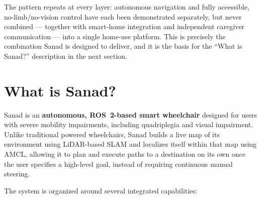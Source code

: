 The pattern repeats at every layer: autonomous navigation and fully accessible, no-limb/no-vision control have each been demonstrated separately, but never combined --- together with smart-home integration and independent caregiver communication --- into a single home-use platform. This is precisely the combination Sanad is designed to deliver, and it is the basis for the ``What is Sanad?'' description in the next section.

\section{What is Sanad?}

Sanad is an \textbf{autonomous, ROS~2-based smart wheelchair} designed for users with severe mobility impairments, including quadriplegia and visual impairment. Unlike traditional powered wheelchairs, Sanad builds a live map of its environment using LiDAR-based SLAM and localizes itself within that map using AMCL, allowing it to plan and execute paths to a destination on its own once the user specifies a high-level goal, instead of requiring continuous manual steering.

The system is organized around several integrated capabilities:

